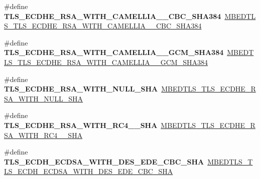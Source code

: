 \begin{DoxyCompactItemize}
\item 
\mbox{\label{compat-1_83_8h_a3b4d7bc3bb5754d6ad4238e9ccfcab92}} 
\#define {\bfseries T\+L\+S\+\_\+\+E\+C\+D\+H\+E\+\_\+\+R\+S\+A\+\_\+\+W\+I\+T\+H\+\_\+\+C\+A\+M\+E\+L\+L\+I\+A\+\_\+\_\+\+C\+B\+C\+\_\+\+S\+H\+A384}~\mbox{\hyperlink{ssl__ciphersuites_8h_ab212aa3f9d2551530a74e5cfc26ee83c}{M\+B\+E\+D\+T\+L\+S\+\_\+\+T\+L\+S\+\_\+\+E\+C\+D\+H\+E\+\_\+\+R\+S\+A\+\_\+\+W\+I\+T\+H\+\_\+\+C\+A\+M\+E\+L\+L\+I\+A\+\_\+\_\+\+C\+B\+C\+\_\+\+S\+H\+A384}}
\item 
\mbox{\label{compat-1_83_8h_ab691f2a1123765e0df9c36f52dbd746e}} 
\#define {\bfseries T\+L\+S\+\_\+\+E\+C\+D\+H\+E\+\_\+\+R\+S\+A\+\_\+\+W\+I\+T\+H\+\_\+\+C\+A\+M\+E\+L\+L\+I\+A\+\_\+\_\+\+G\+C\+M\+\_\+\+S\+H\+A384}~\mbox{\hyperlink{ssl__ciphersuites_8h_a3ca0c1514848eb8dbd636052c7e9b7a6}{M\+B\+E\+D\+T\+L\+S\+\_\+\+T\+L\+S\+\_\+\+E\+C\+D\+H\+E\+\_\+\+R\+S\+A\+\_\+\+W\+I\+T\+H\+\_\+\+C\+A\+M\+E\+L\+L\+I\+A\+\_\+\_\+\+G\+C\+M\+\_\+\+S\+H\+A384}}
\item 
\mbox{\label{compat-1_83_8h_abb06a95e3e9f2a98ab747ad8272188ad}} 
\#define {\bfseries T\+L\+S\+\_\+\+E\+C\+D\+H\+E\+\_\+\+R\+S\+A\+\_\+\+W\+I\+T\+H\+\_\+\+N\+U\+L\+L\+\_\+\+S\+HA}~\mbox{\hyperlink{ssl__ciphersuites_8h_a6a3b1aaac1798df68b54a88229222476}{M\+B\+E\+D\+T\+L\+S\+\_\+\+T\+L\+S\+\_\+\+E\+C\+D\+H\+E\+\_\+\+R\+S\+A\+\_\+\+W\+I\+T\+H\+\_\+\+N\+U\+L\+L\+\_\+\+S\+HA}}
\item 
\mbox{\label{compat-1_83_8h_ad9243148f8f1b15e127b5f26937eb459}} 
\#define {\bfseries T\+L\+S\+\_\+\+E\+C\+D\+H\+E\+\_\+\+R\+S\+A\+\_\+\+W\+I\+T\+H\+\_\+\+R\+C4\+\_\+\_\+\+S\+HA}~\mbox{\hyperlink{ssl__ciphersuites_8h_abdbb224bb71f7daae7035735c8608af2}{M\+B\+E\+D\+T\+L\+S\+\_\+\+T\+L\+S\+\_\+\+E\+C\+D\+H\+E\+\_\+\+R\+S\+A\+\_\+\+W\+I\+T\+H\+\_\+\+R\+C4\+\_\+\_\+\+S\+HA}}
\item 
\mbox{\label{compat-1_83_8h_a0dbc6ba5cbc0ace16bb0590f8bab004e}} 
\#define {\bfseries T\+L\+S\+\_\+\+E\+C\+D\+H\+\_\+\+E\+C\+D\+S\+A\+\_\+\+W\+I\+T\+H\+\_\+D\+E\+S\+\_\+\+E\+D\+E\+\_\+\+C\+B\+C\+\_\+\+S\+HA}~\mbox{\hyperlink{ssl__ciphersuites_8h_a01387460cc5c7c9572d108fcf849a8b6}{M\+B\+E\+D\+T\+L\+S\+\_\+\+T\+L\+S\+\_\+\+E\+C\+D\+H\+\_\+\+E\+C\+D\+S\+A\+\_\+\+W\+I\+T\+H\+\_\+D\+E\+S\+\_\+\+E\+D\+E\+\_\+\+C\+B\+C\+\_\+\+S\+HA}}

\end{DoxyCompactItemize}
